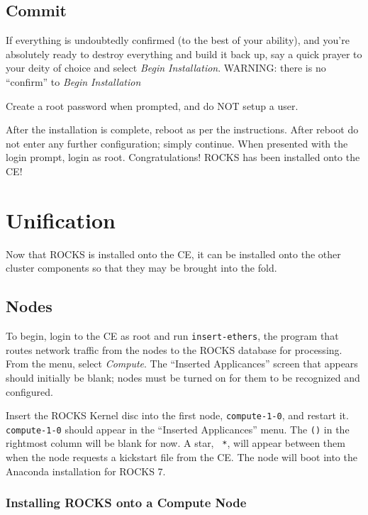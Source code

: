 \documentclass[12pt]{article}
\begin{document}
\subsection{Commit}

\qq If everything is undoubtedly confirmed (to the best of your ability), and
you're absolutely ready to destroy everything and build it back up, say a quick
prayer to your deity of choice and select \textit{Begin Installation}. WARNING:
there is no ``confirm'' to \textit{Begin Installation}

\qq Create a root password when prompted, and do NOT setup a user.

\qq After the installation is complete, reboot as per the instructions. After
reboot do not enter any further configuration; simply continue. When presented
with the login prompt, login as root. Congratulations! ROCKS has been installed
onto the CE!



\section{Unification}

\qq Now that ROCKS is installed onto the CE, it can be installed onto the other
cluster components so that they may be brought into the fold.

\subsection{Nodes}

\qq To begin, login to the CE as root and run {\tt insert-ethers}, the program
that routes network traffic from the nodes to the ROCKS database for processing.
From the menu, select \textit{Compute}. The ``Inserted Applicances'' screen that
appears should initially be blank; nodes must be turned on for them to be
recognized and configured.

\qq Insert the ROCKS Kernel disc into the first node, {\tt compute-1-0}, and
restart it. {\tt compute-1-0} should appear in the ``Inserted Applicances''
menu. The {\tt ()} in the rightmost column will be blank for now. A star, {\tt
  *}, will appear between them when the node requests a kickstart file from the
CE. The node will boot into the Anaconda installation for ROCKS 7.

\subsubsection{Installing ROCKS onto a Compute Node}
\end{document}
